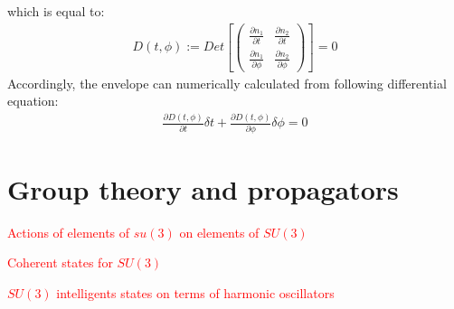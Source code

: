 \documentclass[9pt,twocolumn,twoside]{osajnl}
\begin{document}
which is equal to:
\begin{eqnarray}
D(t, \phi):=Det[\left(  \begin{array}{cc} 
\frac{\partial n_1}{\partial t} & \frac{\partial n_2}{\partial t} \\
\frac{\partial n_1}{\partial \phi} & \frac{\partial n_2}{\partial \phi} 
\end{array} \right)] = 0
\end{eqnarray}
Accordingly, the envelope can numerically
calculated from following differential equation:
\begin{eqnarray}
\frac{\partial D(t,\phi)}{\partial t} \delta t +
\frac{\partial D(t,\phi)}{\partial \phi} \delta \phi = 0
\end{eqnarray}






\section{Group theory and propagators}

\textcolor{red}{Actions of elements of $su(3)$ on elements of $SU(3)$ \cite{Nelson1967p857}}

\textcolor{red}{Coherent states for $SU(3)$ \cite{Gnutzmann1998p9871}}

\textcolor{red}{$SU(3)$ intelligents states on terms of harmonic oscillators \cite{Rowe1999p3604}}
\end{document}
